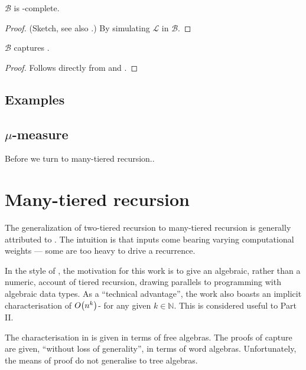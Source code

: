 \begin{lemma} \label{lem:b-fptime-complete} $\mathcal{B}$ is
\FPTIME{}-complete.  \end{lemma}

\begin{proof} (Sketch, see also \cite{bellantoni-cook-1992}.) By simulating
$\mathcal{L}$ in $\mathcal{B}$.  \end{proof}

\begin{theorem} $\mathcal{B}$ captures \FPTIME{}. \end{theorem}

\begin{proof} Follows directly from  and
. \end{proof}

\subsection{Examples}

\subsection{$\mu$-measure}

Before we turn to many-tiered recursion..

\section{Many-tiered recursion}

The generalization of two-tiered recursion to many-tiered recursion is
generally attributed to \cite{leivant-1995}. The intuition is that inputs come
bearing varying computational weights --- some are too heavy to drive a
recurrence.

In the style of \cite{leivant-1990}, the motivation for this work is to give an
algebraic, rather than a numeric, account of tiered recursion, drawing
parallels to programming with algebraic data types. As a ``technical
advantage'', the work also boasts an implicit characterisation of
$O{\mathopen{}\left({n^k}\right)\mathclose{}}$-\TIME{} for any given $k\in \mathbb{N}$. This is considered useful
to Part II.

The characterisation in \cite{leivant-1995} is given in terms of free algebras.
The proofs of capture are given, ``without loss of generality'', in terms of
word algebras. Unfortunately, the means of proof do not generalise to tree
algebras\cite{caseiro-1996, dal-lago-et-al-2010}.

